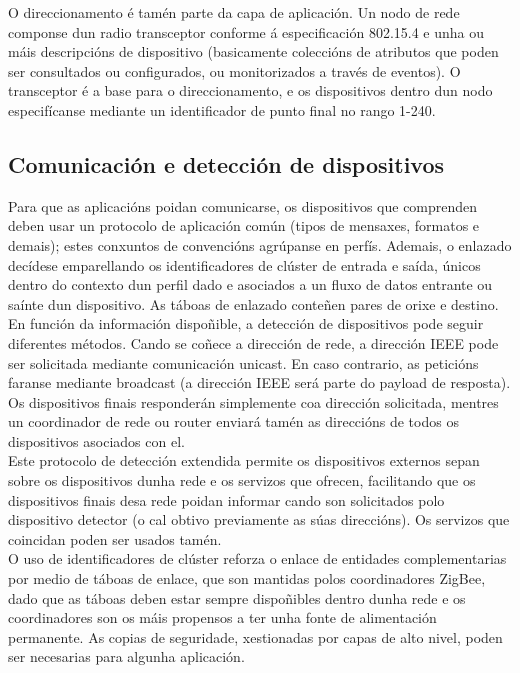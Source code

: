  O direccionamento é tamén parte da capa de aplicación. Un nodo de rede
 componse dun radio transceptor conforme á especificación 802.15.4 e unha ou
 máis descripcións de dispositivo (basicamente coleccións de atributos que
 poden ser consultados ou configurados, ou monitorizados a través de eventos).
 O transceptor é a base para o direccionamento, e os dispositivos dentro dun
 nodo especifícanse mediante un identificador de punto final no rango 1-240.

 \subsection{Comunicación e detección de dispositivos}

 Para que as aplicacións poidan comunicarse, os dispositivos que comprenden
 deben usar un protocolo de aplicación común (tipos de mensaxes, formatos e
 demais); estes conxuntos de convencións agrúpanse en perfís. Ademais, o
 enlazado decídese emparellando os identificadores de clúster de entrada e
 saída, únicos dentro do contexto dun perfil dado e asociados a un fluxo de
 datos entrante ou saínte dun dispositivo. As táboas de enlazado conteñen pares
 de orixe e destino. \\

 En función da información dispoñible, a detección de dispositivos pode seguir
 diferentes métodos. Cando se coñece a dirección de rede, a dirección IEEE pode
 ser solicitada mediante comunicación unicast. En caso contrario, as peticións
 faranse mediante broadcast (a dirección IEEE será parte do payload de
 resposta). Os dispositivos finais responderán simplemente coa dirección
 solicitada, mentres un coordinador de rede ou router enviará tamén as
 direccións de todos os dispositivos asociados con el. \\

 Este protocolo de detección extendida permite os dispositivos externos sepan
 sobre os dispositivos dunha rede e os servizos que ofrecen, facilitando que os
 dispositivos finais desa rede poidan informar cando son solicitados polo
 dispositivo detector (o cal obtivo previamente as súas direccións). Os
 servizos que coincidan poden ser usados tamén. \\

 O uso de identificadores de clúster reforza o enlace de entidades
 complementarias por medio de táboas de enlace, que son mantidas polos
 coordinadores ZigBee, dado que as táboas deben estar sempre dispoñibles dentro
 dunha rede e os coordinadores son os máis propensos a ter unha fonte de
 alimentación permanente. As copias de seguridade, xestionadas por capas de
 alto nivel, poden ser necesarias para algunha aplicación. \\


